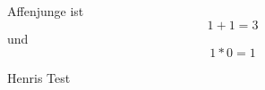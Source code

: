\documentclass[a4paper,12pt]{article}
\begin{document}
Affenjunge ist
\begin{equation}
	1+1=3
\end{equation}
und 
\begin{equation}
	1*0=1
\end{equation}

Henris Test
\end{document}

